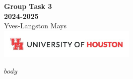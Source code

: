 \documentclass{report}
\begin{document}
\begin{titlepage}
    \centering
    \vspace*{5cm}
    {\Huge \textbf{Group Task 3\\[0.5em] 2024-2025}} \\[1.5em]
    {\Large Yves-Langston Mays} \\[2.5em]
    \vfill
    \includegraphics[width=0.5\textwidth]{UHLogo_Long.png}
    \vspace{0.8cm}
\end{titlepage}

\begingroup
\let\clearpage\relax
\tableofcontents
\endgroup
\relax
\relax

$body$
\end{document}
